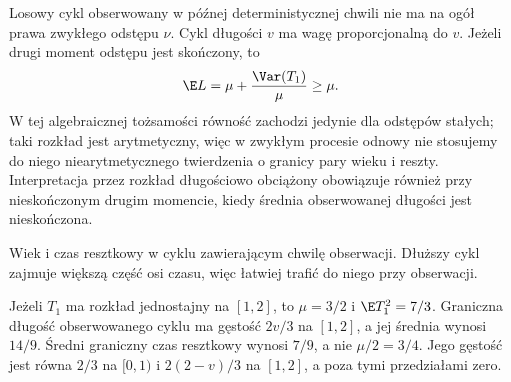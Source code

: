 \begin{uwaga}
Losowy cykl obserwowany w późnej deterministycznej
chwili nie ma na ogół prawa zwykłego odstępu $\nu$.
Cykl długości $v$ ma wagę proporcjonalną do $v$.
Jeżeli drugi moment odstępu jest skończony, to
\[
\E L=\mu+\frac{\Var(T_1)}{\mu}\ge\mu.
\]
W tej algebraicznej tożsamości równość zachodzi
jedynie dla odstępów stałych; taki rozkład jest
arytmetyczny, więc w zwykłym procesie odnowy
nie stosujemy do niego niearytmetycznego
twierdzenia o granicy pary wieku i reszty.
Interpretacja przez rozkład długościowo obciążony
obowiązuje również przy nieskończonym drugim
momencie, kiedy średnia obserwowanej długości
jest nieskończona.
\end{uwaga}

\begin{center}
\par\smallskip\small Wiek i czas resztkowy w cyklu
zawierającym chwilę obserwacji. Dłuższy cykl
zajmuje większą część osi czasu, więc łatwiej
trafić do niego przy obserwacji.
\end{center}

\begin{przyklad}
Jeżeli $T_1$ ma rozkład jednostajny na $[1,2]$,
to $\mu=3/2$ i $\E T_1^2=7/3$.
Graniczna długość obserwowanego cyklu ma gęstość
$2v/3$ na $[1,2]$, a jej średnia wynosi $14/9$.
Średni graniczny czas resztkowy wynosi $7/9$,
a nie $\mu/2=3/4$. Jego gęstość jest równa
$2/3$ na $[0,1)$ i $2(2-v)/3$ na $[1,2]$,
a poza tymi przedziałami zero.
\end{przyklad}

